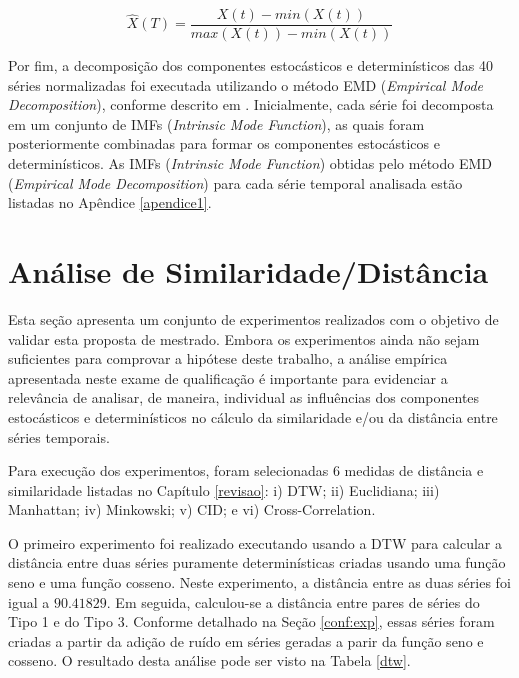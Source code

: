 \begin{equation}\label{norma}
\hat{X}(T) =\frac{X(t)-min(X(t))}{max(X(t))-min(X(t))}
 \end{equation}

Por fim, a decomposição dos componentes estocásticos e determinísticos das 40 séries normalizadas foi executada utilizando o método EMD (\emph{Empirical Mode Decomposition}), conforme descrito em . Inicialmente, cada série foi decomposta em um conjunto de IMFs (\emph{Intrinsic Mode Function}), as quais foram posteriormente combinadas para formar os componentes estocásticos e determinísticos. As IMFs (\emph{Intrinsic Mode Function}) obtidas pelo método EMD (\emph{Empirical Mode Decomposition}) para cada série temporal analisada estão listadas no Apêndice \ref{apendice1}.

\section{Análise de Similaridade/Distância}

Esta seção apresenta um conjunto de experimentos realizados com o objetivo de validar esta proposta de mestrado. Embora os experimentos ainda não sejam suficientes para comprovar a hipótese deste trabalho, a análise empírica apresentada neste exame de qualificação é importante para evidenciar a relevância de analisar, de maneira, individual as influências dos componentes estocásticos e determinísticos no cálculo da similaridade e/ou da distância entre séries temporais.

Para execução dos experimentos, foram selecionadas 6 medidas de distância e similaridade listadas no Capítulo \ref{revisao}: i) DTW; ii) Euclidiana; iii) Manhattan; iv) Minkowski; v) CID; e vi) Cross-Correlation.

O primeiro experimento foi realizado executando usando a DTW para calcular a distância entre duas séries puramente determinísticas criadas usando uma função seno e uma função cosseno. Neste experimento, a distância entre as duas séries foi igual a $90.41829$. Em seguida, calculou-se a distância entre pares de séries do Tipo 1 e do Tipo 3. Conforme detalhado na Seção \ref{conf:exp}, essas séries foram criadas a partir da adição de ruído em séries geradas a parir da função seno e cosseno. O resultado desta análise pode ser visto na Tabela \ref{dtw}.

